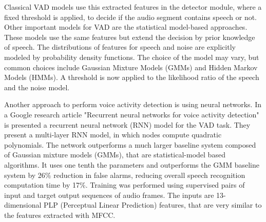 \documentclass[../main.tex]{subfiles}
\begin{document}
Classical VAD models use this extracted features in the detector module, where a fixed threshold is applied, to decide if the audio segment contains speech or not. Other important models for VAD are the statistical model-based approaches. These models use the same features but extend the decision by prior knowledge of speech. The distributions of features for speech and noise are explicitly modeled by probability density functions. The choice of the model may vary, but common choices include Gaussian Mixture Models (GMMs) and Hidden Markov Models (HMMs). A threshold is now applied to the likelihood ratio of the speech and the noise model.

Another approach to perform voice activity detection is using neural networks. In a Google research article "Recurrent neural networks for voice activity detection" \cite{googleRNN} is presented a recurrent neural network (RNN) model for the VAD task. They present a multi-layer RNN model, in which nodes compute quadratic polynomials. The network outperforms a much larger baseline system composed of Gaussian mixture models (GMMs), that are statistical-model based algorithms. It uses one tenth the parameters and outperforms the GMM baseline system by 26\% reduction in false alarms, reducing overall speech recognition computation time by 17\%. Training was performed using supervised pairs of input and target output sequences of audio frames. The inputs are 13-dimensional PLP (Perceptual Linear Prediction) features, that are very similar to the features extracted with MFCC. 
 
\end{document}
